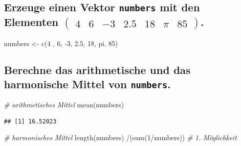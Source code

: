 \documentclass[12pt,a4paper]{article}
\newenvironment{Shaded}{\begin{snugshade}}{\end{snugshade}}
\newcommand{\CommentTok}[1]{\textcolor[rgb]{0.56,0.35,0.01}{\textit{#1}}}
\newcommand{\DecValTok}[1]{\textcolor[rgb]{0.00,0.00,0.81}{#1}}
\newcommand{\FloatTok}[1]{\textcolor[rgb]{0.00,0.00,0.81}{#1}}
\newcommand{\FunctionTok}[1]{\textcolor[rgb]{0.00,0.00,0.00}{#1}}
\newcommand{\NormalTok}[1]{#1}
\newcommand{\OtherTok}[1]{\textcolor[rgb]{0.56,0.35,0.01}{#1}}
\newcommand{\SpecialCharTok}[1]{\textcolor[rgb]{0.00,0.00,0.00}{#1}}
\begin{document}
\hypertarget{erzeuge-einen-vektor-mit-den-elementen-beginpmatrix-4-6--3-2.5-18-pi-85-endpmatrix.}{%
\subsection{\texorpdfstring{Erzeuge einen Vektor \texttt{numbers} mit
den Elementen
\(\begin{pmatrix} 4 & 6 & -3 & 2.5 & 18 & \pi & 85 \end{pmatrix}\).}{Erzeuge einen Vektor  mit den Elementen \textbackslash begin\{pmatrix\} 4 \& 6 \& -3 \& 2.5 \& 18 \& \textbackslash pi \& 85 \textbackslash end\{pmatrix\}.}}\label{erzeuge-einen-vektor-mit-den-elementen-beginpmatrix-4-6--3-2.5-18-pi-85-endpmatrix.}}

\begin{Shaded}
\begin{Highlighting}[]
\NormalTok{    numbers }\OtherTok{\textless{}{-}} \FunctionTok{c}\NormalTok{(}\DecValTok{4}\NormalTok{ , }\DecValTok{6}\NormalTok{, }\SpecialCharTok{{-}}\DecValTok{3}\NormalTok{, }\FloatTok{2.5}\NormalTok{, }\DecValTok{18}\NormalTok{, pi, }\DecValTok{85}\NormalTok{)}
\end{Highlighting}
\end{Shaded}

\vspace{0.5cm}

\hypertarget{berechne-das-arithmetische-und-das-harmonische-mittel-von-.}{%
\subsection{\texorpdfstring{Berechne das arithmetische und das
harmonische Mittel von
\texttt{numbers}.}{Berechne das arithmetische und das harmonische Mittel von .}}\label{berechne-das-arithmetische-und-das-harmonische-mittel-von-.}}

\begin{Shaded}
\begin{Highlighting}[]
    \CommentTok{\# arithmetisches Mittel}
    \FunctionTok{mean}\NormalTok{(numbers) }
\end{Highlighting}
\end{Shaded}

\begin{verbatim}
## [1] 16.52023
\end{verbatim}

\begin{Shaded}
\begin{Highlighting}[]
    \CommentTok{\# harmonisches Mittel}
    \FunctionTok{length}\NormalTok{(numbers) }\SpecialCharTok{/}\NormalTok{(}\FunctionTok{sum}\NormalTok{(}\DecValTok{1}\SpecialCharTok{/}\NormalTok{numbers))       }\CommentTok{\# 1. Möglichkeit}
\end{Highlighting}
\end{Shaded}
\end{document}
